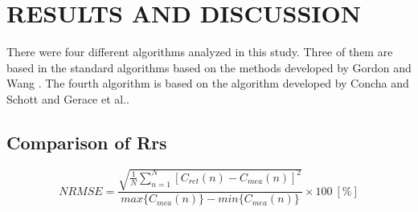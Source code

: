 \documentclass[]{spie}  %
\begin{document}
\section{RESULTS AND DISCUSSION}
\label{sec:results}  %

There were four different algorithms analyzed in this study. Three of them are based in the standard algorithms based on the methods developed by Gordon and Wang \cite{Gordon:1994}. The fourth algorithm is based on the algorithm developed by Concha and Schott\cite{Concha2014SPIE} and Gerace et al.\cite{Gerace:2012}.
\subsection{Comparison of Rrs}

\begin{equation}
\label{eq:NRMSE}
	NRMSE =\frac{\sqrt{\frac{1}{N}\sum_{n=1}^N{\left[C_{ret}(n) - C_{mea}(n)\right]^2}}}{max\{C_{mea}(n)\} - min\{C_{mea}(n)\}}\times100 ~[\%]
\end{equation}
\end{document}
